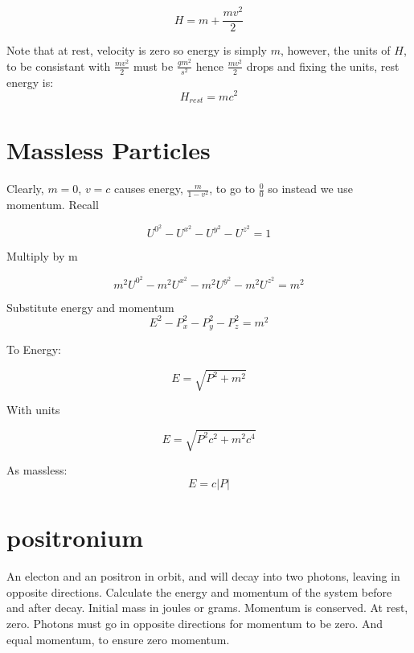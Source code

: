 \documentclass{article}
\begin{document}
\begin{equation}
H = m + \frac{m v^2}{2}
\end{equation}

Note that at rest, velocity is zero so energy is simply $m$, however, the units of $H$, to be consistant with
$\frac{m v^2}{2}$ must be $\frac{g m^2}{s^2}$ hence $\frac{m v^2}{2}$ drops and fixing the units, rest energy is:
\begin{equation}
H_{rest} = mc^2
\end{equation}

\section{Massless Particles}

Clearly, $m=0$, $v=c$ causes energy, $\frac{m}{1 - v^2}$, to go to $\frac{0}{0}$ so instead we use momentum. Recall


\begin{equation}
U^{0^2} - U^{x^2} - U^{y^2} - U^{z^2} = 1
\end{equation}

Multiply by m

\begin{equation}
m^2U^{0^2} - m^2U^{x^2} - m^2U^{y^2} - m^2U^{z^2} = m^2
\end{equation}

Substitute energy and momentum
\begin{equation}
E^2 - P_x^2 - P_y^2 - P_z^2 = m^2
\end{equation}

To Energy:

\begin{equation}
E = \sqrt{P^2 + m^2}
\end{equation}

With units

\begin{equation}
E = \sqrt{P^2 c^2 + m^2 c^4}
\end{equation}

As massless:
\begin{equation}
E = c |P|
\end{equation}

\section{positronium}

An electon and an positron in orbit, and will decay into two photons, leaving in opposite directions.
Calculate the energy and momentum of the system before and after decay.  Initial mass in joules or grams.
Momentum is conserved.  At rest, zero.  Photons must go in opposite directions for momentum to be zero.  And equal momentum, to ensure zero momentum.
\end{document}
